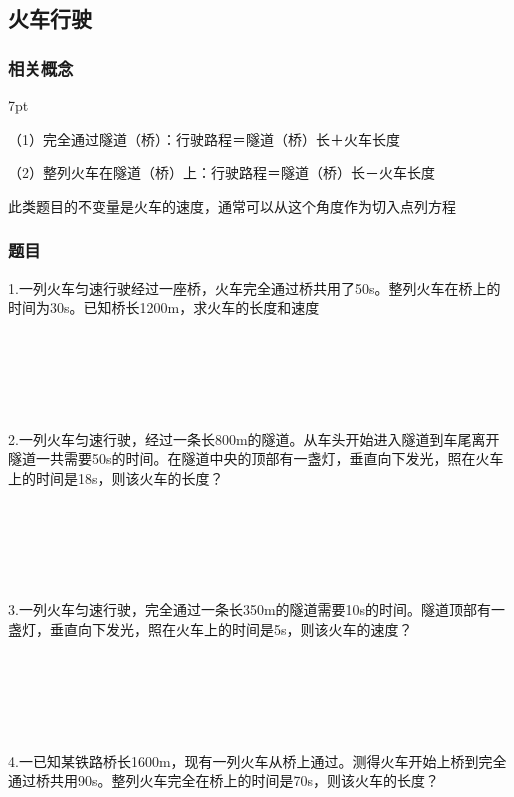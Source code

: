 \documentclass{article}
\newenvironment{wa}{%
\def\FrameCommand{%
\hspace{1pt}%
{\color{LightCoral}\vrule width 2pt}%
{\color{washade}\vrule width 4pt}%
\colorbox{washade}%
}%
\MakeFramed{\advance\hsize-\width\FrameRestore}%
\noindent\hspace{-4.55pt}%
\begin{adjustwidth}{}{7pt}%
\vspace{2pt}\vspace{2pt}%
\normalfont %
}
{%
\vspace{2pt}\end{adjustwidth}\endMakeFramed%
}
\begin{document}
~\\
~\\
~\\
~\\
~\\

\subsection{火车行驶}
\subsubsection*{相关概念}
\begin{wa}
\quad \quad （1）完全通过隧道（桥）：行驶路程＝隧道（桥）长＋火车长度

（2）整列火车在隧道（桥）上：行驶路程＝隧道（桥）长－火车长度

此类题目的不变量是火车的速度，通常可以从这个角度作为切入点列方程
\end{wa}
\subsubsection*{题目}
1.一列火车匀速行驶经过一座桥，火车完全通过桥共用了50s。整列火车在桥上的时间为30s。已知桥长1200m，求火车的长度和速度

~\\
~\\
~\\
~\\
~\\
2.一列火车匀速行驶，经过一条长800m的隧道。从车头开始进入隧道到车尾离开隧道一共需要50s的时间。在隧道中央的顶部有一盏灯，垂直向下发光，照在火车上的时间是18s，则该火车的长度？

~\\
~\\
~\\
~\\
~\\
3.一列火车匀速行驶，完全通过一条长350m的隧道需要10s的时间。隧道顶部有一盏灯，垂直向下发光，照在火车上的时间是5s，则该火车的速度？

~\\
~\\
~\\
~\\
~\\
4.一已知某铁路桥长1600m，现有一列火车从桥上通过。测得火车开始上桥到完全通过桥共用90s。整列火车完全在桥上的时间是70s，则该火车的长度？
\end{document}
